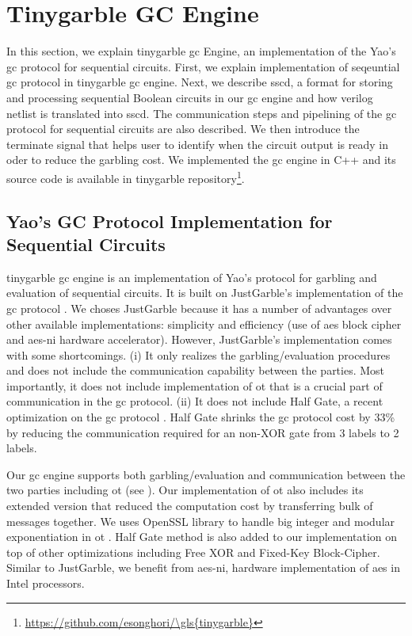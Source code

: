 \chapter{Tinygarble GC Engine}\label{chap:engine}
In this section, we explain \gls{tinygarble} \acrshort{gc} Engine, an implementation of the Yao's \acrshort{gc} protocol for sequential circuits.
First, we explain implementation of seqeuntial \acrshort{gc} protocol in \gls{tinygarble} \acrshort{gc} engine.
Next, we describe \acrfull{sscd}, a format for storing and processing sequential Boolean circuits in our \acrshort{gc} engine and how \gls{verilog} \gls{netlist} is translated into \acrshort{sscd}.
The communication steps and pipelining of the \acrshort{gc} protocol for sequential circuits are also described.
We then introduce the terminate signal that helps user to identify when the circuit output is ready in oder to reduce the garbling cost.
We implemented the \acrshort{gc} engine in C++ and its source code is available in \gls{tinygarble} repository\footnote{\url{https://github.com/esonghori/\gls{tinygarble}}}.

\section{Yao's GC Protocol Implementation for Sequential Circuits} \label{sec:engine-gc}
\gls{tinygarble} \acrshort{gc} engine is an implementation of Yao's protocol for garbling and evaluation of sequential circuits.
It is built on JustGarble's implementation of the \acrshort{gc} protocol \cite{bellare2013efficient}.
We choses JustGarble because it has a number of advantages over other available implementations: simplicity and efficiency (use of \acrshort{aes} block cipher and \acrshort{aes-ni} hardware accelerator).
However, JustGarble's implementation comes with some shortcomings.
(i) It only realizes the garbling/evaluation procedures and does not include the communication capability between the parties.
Most importantly, it does not include implementation of \acrshort{ot} that is a crucial part of communication in the \acrshort{gc} protocol.
(ii) It does not include Half Gate, a recent optimization on the \acrshort{gc} protocol \cite{zahur2015two}.
Half Gate shrinks the \acrshort{gc} protocol cost by 33\% by reducing the communication required for an non-XOR gate from 3 labels to 2 labels.

Our \acrshort{gc} engine supports both garbling/evaluation and communication between the two parties including \acrshort{ot} (see ).
Our implementation of \acrshort{ot} also includes its extended version \cite{husted2013gpu} that reduced the computation cost by transferring bulk of messages together.
We uses OpenSSL library to handle big integer and modular exponentiation in \acrshort{ot} \cite{viega2002network}.
Half Gate method is also added to our implementation on top of other optimizations including Free XOR and Fixed-Key Block-Cipher.
Similar to JustGarble, we benefit from \acrshort{aes-ni}, hardware implementation of \acrshort{aes} in Intel processors.

